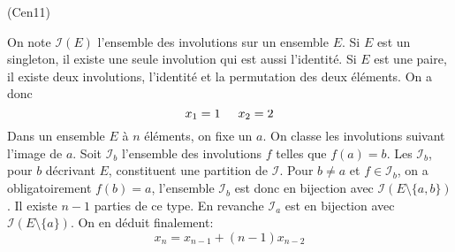 \begin{tiny}(Cen11)\end{tiny} On note $\mathcal I(E)$ l'ensemble des involutions sur un ensemble $E$. Si $E$ est un singleton, il existe une seule involution qui est aussi l'identité. Si $E$ est une paire, il existe deux involutions, l'identité et la permutation des deux éléments. On a donc
\begin{displaymath}
 x_1=1 \hspace{0.5cm}x_2=2
\end{displaymath}
Dans un ensemble $E$ à $n$ éléments, on fixe un $a$. On classe les involutions suivant l'image de $a$. Soit 
$\mathcal I_b$ l'ensemble des involutions $f$ telles que $f(a)=b$. Les $\mathcal{I}_b$, pour $b$ décrivant $E$, constituent une partition de $\mathcal I$.\newline
Pour $b\neq a$ et $f\in \mathcal{I}_b$, on a obligatoirement $f(b)=a$, l'ensemble $\mathcal{I}_b$ est donc en bijection avec $\mathcal{I}(E\setminus\{a,b\})$. Il existe $n-1$ parties de ce type.\newline
En revanche $\mathcal I_a$ est en bijection avec $\mathcal{I}(E\setminus\{a\})$. On en déduit finalement:
\begin{displaymath}
 x_n = x_{n-1} + (n-1)x_{n-2}
\end{displaymath}
 
